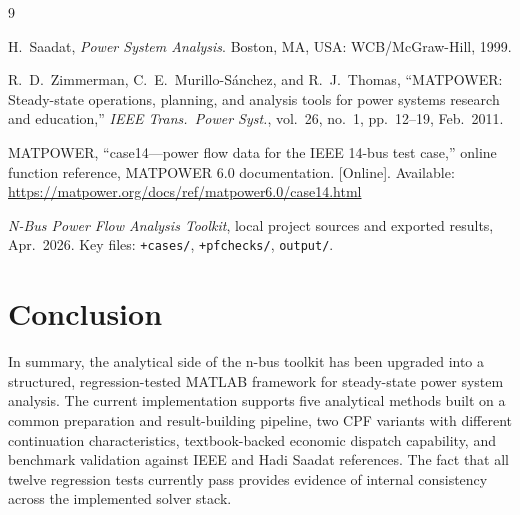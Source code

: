 \documentclass[12pt,a4paper]{article}
\begin{document}
\begin{thebibliography}{9}

H.~Saadat, \textit{Power System Analysis}.
Boston, MA, USA: WCB/McGraw-Hill, 1999.

R.~D.~Zimmerman, C.~E.~Murillo-S\'{a}nchez, and R.~J.~Thomas,
``MATPOWER: Steady-state operations, planning, and analysis tools for power systems research and education,''
\textit{IEEE Trans.\ Power Syst.}, vol.~26, no.~1, pp.~12--19, Feb.~2011.

MATPOWER, ``case14---power flow data for the IEEE 14-bus test case,''
online function reference, MATPOWER 6.0 documentation.
[Online]. Available: \url{https://matpower.org/docs/ref/matpower6.0/case14.html}

\textit{N-Bus Power Flow Analysis Toolkit}, local project sources and
exported results, Apr.~2026.
Key files: \texttt{+cases/}, \texttt{+pfchecks/}, \texttt{output/}.

\end{thebibliography}

\section{Conclusion}

In summary, the analytical side of the n-bus toolkit has been upgraded into a structured, regression-tested MATLAB framework for steady-state power system analysis. The current implementation supports five analytical methods built on a common preparation and result-building pipeline, two CPF variants with different continuation characteristics, textbook-backed economic dispatch capability, and benchmark validation against IEEE and Hadi Saadat references. The fact that all twelve regression tests currently pass provides evidence of internal consistency across the implemented solver stack.
\end{document}
